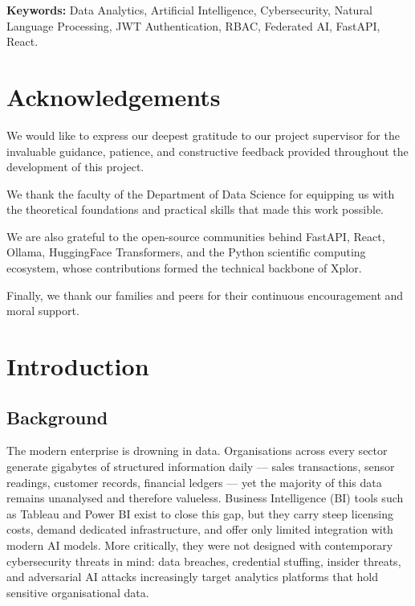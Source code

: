 \documentclass[12pt,a4paper]{report}
\begin{document}
\vspace{0.5cm}
\noindent\textbf{Keywords:} Data Analytics, Artificial Intelligence, Cybersecurity, Natural Language Processing, JWT Authentication, RBAC, Federated AI, FastAPI, React.

\chapter*{Acknowledgements}

We would like to express our deepest gratitude to our project supervisor for the invaluable guidance, patience, and constructive feedback provided throughout the development of this project.

We thank the faculty of the Department of Data Science for equipping us with the theoretical foundations and practical skills that made this work possible.

We are also grateful to the open-source communities behind FastAPI, React, Ollama, HuggingFace Transformers, and the Python scientific computing ecosystem, whose contributions formed the technical backbone of Xplor.

Finally, we thank our families and peers for their continuous encouragement and moral support.

\tableofcontents
\listoffigures
\listoftables

\clearpage

\chapter{Introduction}

\section{Background}

The modern enterprise is drowning in data. Organisations across every sector generate gigabytes of structured information daily — sales transactions, sensor readings, customer records, financial ledgers — yet the majority of this data remains unanalysed and therefore valueless. Business Intelligence (BI) tools such as Tableau and Power BI exist to close this gap, but they carry steep licensing costs, demand dedicated infrastructure, and offer only limited integration with modern AI models. More critically, they were not designed with contemporary cybersecurity threats in mind: data breaches, credential stuffing, insider threats, and adversarial AI attacks increasingly target analytics platforms that hold sensitive organisational data.
\end{document}

